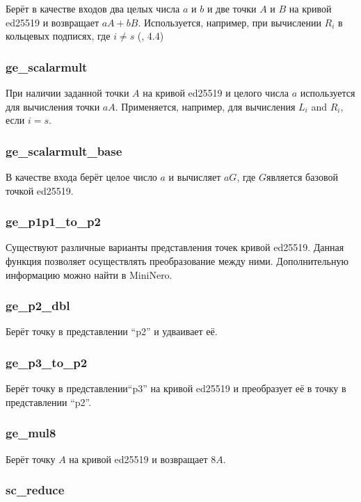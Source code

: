 \documentclass{mrl}
\numberwithin{equation}{section}
\numberwithin{figure}{section}
\begin{document}
Берёт в качестве входов два целых числа $a$ и $b$ и две точки $A$ и $B$ на кривой ed25519 и возвращает $aA+bB$. Используется, например, при вычислении $R_{i}$ в кольцевых подписях, где $i\neq s$ (\cite{CN}, 4.4)

\subsubsection{ge\_scalarmult}

При наличии заданной точки $A$ на кривой ed25519 и целого числа $a$ используется для вычисления точки $aA$. Применяется, например, для вычисления $L_{i}$ and $R_{i}$, если $i=s$.


\subsubsection{ge\_scalarmult\_base}

В качестве входа берёт целое число $a$ и вычисляет $aG$, где $G$является базовой точкой ed25519.

\subsubsection{ge\_p1p1\_to\_p2}

Существуют различные варианты представления точек кривой ed25519. Данная функция позволяет осуществлять преобразование между ними. Дополнительную информацию можно найти в MiniNero.

\subsubsection{ge\_p2\_dbl}

Берёт точку в представлении ``p2'' и удваивает её.


\subsubsection{ge\_p3\_to\_p2}

Берёт точку в представлении``p3'' на кривой ed25519 и преобразует её в точку в представлении ``p2''.

\subsubsection{ge\_mul8}

Берёт точку $A$ на кривой ed25519 и возвращает $8A$.

\subsubsection{sc\_reduce}
\end{document}
